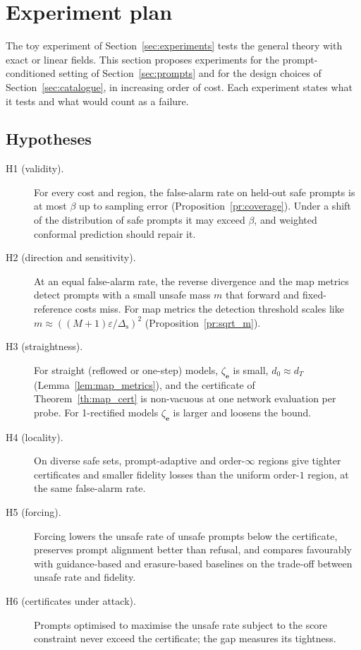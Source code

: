 \documentclass{article}
\newcommand{\be}{\mathbf{e}}                       %
\theoremstyle{plain}
\begin{document}
\section{Experiment plan}\label{sec:plan}

The toy experiment of Section~\ref{sec:experiments} tests the general theory with exact or linear fields.
This section proposes experiments for the prompt-conditioned setting of Section~\ref{sec:prompts} and for
the design choices of Section~\ref{sec:catalogue}, in increasing order of cost. Each experiment states what
it tests and what would count as a failure.

\subsection{Hypotheses}\label{subsec:hypotheses}
\begin{description}
\item[H1 (validity).] For every cost and region, the false-alarm rate on held-out safe prompts is at most
$\beta$ up to sampling error (Proposition~\ref{pr:coverage}). Under a shift of the distribution of safe
prompts it may exceed $\beta$, and weighted conformal prediction should repair it.
\item[H2 (direction and sensitivity).] At an equal false-alarm rate, the reverse divergence and the map
metrics detect prompts with a small unsafe mass $m$ that forward and fixed-reference costs miss. For map
metrics the detection threshold scales like $m\approx((M+1)\varepsilon/\Delta_{\mathrm{s}})^2$ (Proposition~\ref{pr:sqrt_m}).
\item[H3 (straightness).] For straight (reflowed or one-step) models, $\zeta_{\be}$ is small, $d_0\approx d_T$
(Lemma~\ref{lem:map_metrics}), and the certificate of Theorem~\ref{th:map_cert} is non-vacuous at one network
evaluation per probe. For 1-rectified models $\zeta_{\be}$ is larger and loosens the bound.
\item[H4 (locality).] On diverse safe sets, prompt-adaptive and order-$\infty$ regions give tighter certificates
and smaller fidelity losses than the uniform order-$1$ region, at the same false-alarm rate.
\item[H5 (forcing).] Forcing lowers the unsafe rate of unsafe prompts below the certificate, preserves prompt
alignment better than refusal, and compares favourably with guidance-based and erasure-based baselines on
the trade-off between unsafe rate and fidelity.
\item[H6 (certificates under attack).] Prompts optimised to maximise the unsafe rate subject to the score
constraint never exceed the certificate; the gap measures its tightness.
\end{description}
\end{document}

